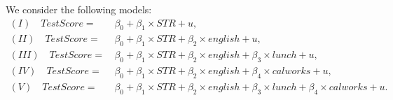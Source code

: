 \documentclass[
  12pt,
  letterpaper,
]{scrbook}
\theoremstyle{plain}
\theoremstyle{definition}
\theoremstyle{remark}
\begin{document}
We consider the following models: \[
\begin{aligned}
  (I) \quad TestScore=& \, \beta_0 + \beta_1 \times STR + u, \\
  (II) \quad TestScore=& \, \beta_0 + \beta_1 \times STR + \beta_2 \times english + u, \\
  (III) \quad TestScore=& \, \beta_0 + \beta_1 \times STR + \beta_2 \times english + \beta_3 \times lunch + u, \\
  (IV) \quad TestScore=& \, \beta_0 + \beta_1 \times STR + \beta_2 \times english + \beta_4 \times calworks + u, \\
  (V) \quad TestScore=& \, \beta_0 + \beta_1 \times STR + \beta_2 \times english + \beta_3 \times lunch + \beta_4 \times calworks + u.
\end{aligned}
\]
\end{document}
